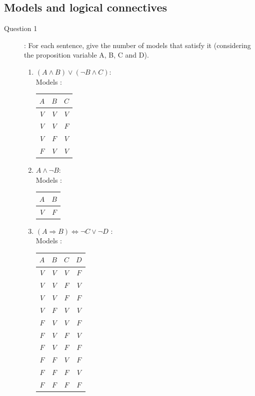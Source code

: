 \subsection{Models and logical connectives}
\begin{description}
\item[Question 1]: For each sentence, give the number of models that satisfy it (considering the proposition variable A, B, C and D). \\
\begin{enumerate}
\item $(A \wedge B) \vee ( \neg B \wedge C)$:\\
Models : \\
\begin{center}
\begin{tabular}{|c|c|c|}
\hline
$A$ & $B$ & $C$ \\
\hline
$V$ & $V$ & $V$\\
$V$ & $V$ & $F$\\
$V$ & $F$ & $V$\\
$F$ & $V$ & $V$\\
\hline
\end{tabular}
\end{center}
\item $A \wedge \neg B$:\\
Models : \\
\begin{center}
\begin{tabular}{|c|c|}
\hline
$A$ & $B$\\
\hline
$V$ & $F$ \\
\hline
\end{tabular}
\end{center}
\item $(A \Rightarrow B) \Leftrightarrow \neg C \vee \neg D$ : \\
Models : \\
\begin{center}
\begin{tabular}{|c|c|c|c|}
\hline
$A$ & $B$ & $C$ & $D$\\
\hline
$V$ & $V$ & $V$ & $F$\\
$V$ & $V$ & $F$ & $V$\\
$V$ & $V$ & $F$ & $F$\\
$V$ & $F$ & $V$ & $V$\\
$F$ & $V$ & $V$ & $F$\\
$F$ & $V$ & $F$ & $V$\\
$F$ & $V$ & $F$ & $F$\\
$F$ & $F$ & $V$ & $F$\\
$F$ & $F$ & $F$ & $V$\\
$F$ & $F$ & $F$ & $F$\\
\hline
\end{tabular}
\end{center}
\end{enumerate}
\end{description}

